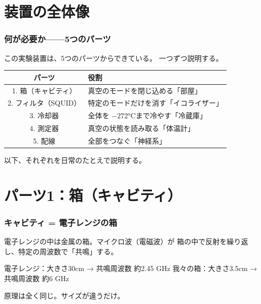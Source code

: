 \documentclass[12pt,a4paper]{article}
\begin{document}
\part{装置の全体像}

\section{何が必要か——5つのパーツ}

この実験装置は、5つのパーツからできている。
一つずつ説明する。

\begin{center}
\renewcommand{\arraystretch}{1.5}
\begin{tabular}{cl}
\toprule
パーツ & 役割 \\
\midrule
1. 箱（キャビティ） & 真空のモードを閉じ込める「部屋」 \\
2. フィルタ（SQUID） & 特定のモードだけを消す「イコライザー」 \\
3. 冷却器 & 全体を $-272$°Cまで冷やす「冷蔵庫」 \\
4. 測定器 & 真空の状態を読み取る「体温計」 \\
5. 配線 & 全部をつなぐ「神経系」 \\
\bottomrule
\end{tabular}
\end{center}

以下、それぞれを日常のたとえで説明する。

\part{パーツ1：箱（キャビティ）}

\section{キャビティ = 電子レンジの箱}

\begin{tatoebabox}
電子レンジの中は金属の箱。マイクロ波（電磁波）が
箱の中で反射を繰り返し、特定の周波数で「共鳴」する。

電子レンジ：大きさ30cm → 共鳴周波数 約2.45 GHz
我々の箱：大きさ3.5cm → 共鳴周波数 約6 GHz

原理は全く同じ。サイズが違うだけ。
\end{tatoebabox}
\end{document}
